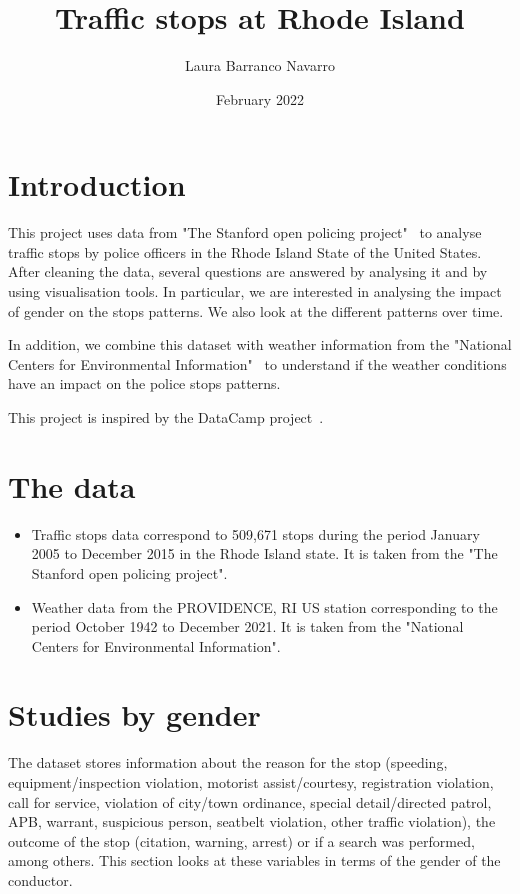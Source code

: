 \documentclass{article}
\title{Traffic stops at Rhode Island}
\author{Laura Barranco Navarro }
\date{February 2022}
\begin{document}
\maketitle
\newpage
\tableofcontents
\newpage
\section{Introduction}
This project uses data from "The Stanford open policing  project"~\cite{StanfordWeb,StanfordPaper} to analyse traffic stops by police officers in the Rhode Island State of the United States. After cleaning the data, several questions are answered by analysing it and by using visualisation tools. In particular, we are interested in analysing the impact of gender  on the stops patterns. We also look at the different patterns over time. 

In addition, we combine this dataset with weather information from the "National Centers for Environmental Information"~\cite{WeatherWeb} to understand if the weather conditions have an impact on the police stops patterns.

This project is inspired by the DataCamp project~\cite{DataCamp}. 

\section{The data}

\begin{itemize}
\item Traffic stops data correspond to 509,671 stops during the period January 2005 to December 2015 in the Rhode Island state. It is taken from the "The Stanford open policing project"\cite{StanfordWeb}.

\item Weather data from the PROVIDENCE, RI US station corresponding to the period October 1942 to December 2021. It is taken from the "National Centers for Environmental Information"\cite{WeatherWeb}.

\end{itemize}

\section{Studies by gender}

The dataset stores information about the reason for the stop (speeding,  equipment/inspection violation, motorist assist/courtesy,  registration violation, call for service, 
 violation of city/town ordinance, special detail/directed patrol, APB, warrant, suspicious person, seatbelt violation, other traffic violation), the outcome of the stop (citation, warning, arrest) or if a search was performed, among others. This section looks at these variables in terms of the gender of the conductor. 
 
\end{document}
